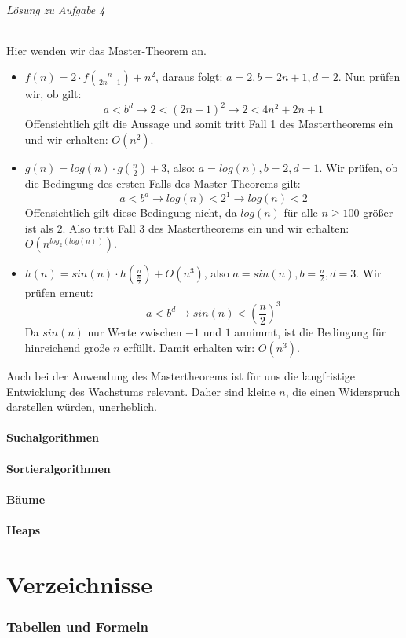 \documentclass[11pt,a4paper]{scrartcl}
\begin{document}
\paragraph{Lösung zu Aufgabe 4} \label{a4:lsg}
Hier wenden wir das Master-Theorem an.
\begin{itemize}
\item $f(n) = 2 \cdot f(\frac{n}{2n+1}) + n^{2}$, daraus folgt: $a = 2, b = 2n + 1, d = 2$. Nun prüfen wir, ob gilt: \[a < b^d \to 2 < (2n+1)^2 \to 2 < 4n^2 + 2n + 1\]
Offensichtlich gilt die Aussage und somit tritt Fall 1 des Mastertheorems ein und wir erhalten: $O(n^2)$.
\item $g(n) = log(n) \cdot g(\frac{n}{2}) + 3$, also: $a = log(n), b = 2, d = 1$. Wir prüfen, ob die Bedingung des ersten Falls des Master-Theorems gilt:
\[a < b^d \to log(n) < 2^1 \to log(n) < 2\]
Offensichtlich gilt diese Bedingung nicht, da $log(n)$ für alle $n \geq 100$ größer ist als $2$. Also tritt Fall 3 des Mastertheorems ein und wir erhalten: $O(n^{log_2(log(n))})$.
\item $h(n) = sin(n) \cdot h(\frac{n}{\frac{n}{2}}) + O(n^{3})$, also $a = sin(n), b = \frac{n}{2}, d = 3$. Wir prüfen erneut: \[
a < b^d \to sin(n) < (\frac{n}{2})^3\]
Da $sin(n)$ nur Werte zwischen $-1$ und $1$ annimmt, ist die Bedingung für hinreichend große $n$ erfüllt. Damit erhalten wir: $O(n^3)$.
\end{itemize}
Auch bei der Anwendung des Mastertheorems ist für uns die langfristige Entwicklung des Wachstums relevant. Daher sind kleine $n$, die einen Widerspruch darstellen würden, unerheblich.
\label{a1.5:lsg}
\label{a1.6:lsg}
\label{a1.7:lsg}
\subsection{Suchalgorithmen}
\label{a2.1:lsg}
\label{a2.2:lsg}
\label{a2.3:lsg}
\label{a2.4:lsg}
\subsection{Sortieralgorithmen}
\label{a3.1:lsg}
\label{a3.2:lsg}
\label{a3.3:lsg}
\label{a3.4:lsg}
\subsection{Bäume}
\label{a4.1:lsg}
\label{a4.2:lsg}
\label{a4.3:lsg}
\label{a4.4:lsg}
\subsection{Heaps}
\label{a5.1:lsg}
\label{a5.2:lsg}
\label{a5.3:lsg}
\label{a5.4:lsg}
\pagebreak
\part{Verzeichnisse}
\section*{Tabellen und Formeln}
\listoffigures
\printbibliography
\end{document}
